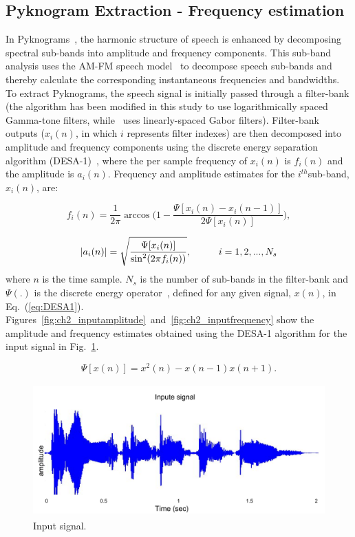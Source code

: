 {\subsection{Pyknogram Extraction - Frequency estimation}
\label{ssec:pykno_estimate}
In Pyknograms~\cite{potamianos_maragos_jasa96}, the harmonic structure of speech is enhanced by decomposing spectral sub-bands into amplitude and frequency components. 
This sub-band analysis uses the AM-FM speech model~\cite{maragos_kaiser_quatieri} to decompose speech sub-bands and thereby calculate the corresponding instantaneous frequencies and bandwidths. 
To extract Pyknograms, the speech signal is initially passed through a filter-bank (the algorithm has been modified in this study to use logarithmically spaced Gamma-tone filters, while~\cite{potamianos_maragos_jasa96} uses linearly-spaced Gabor filters). 
Filter-bank outputs ($x_i(n)$, in which $i$ represents filter indexes) are then decomposed into amplitude and frequency components using the discrete energy separation algorithm (DESA-1)~\cite{maragos_kaiser_quatieri}, where the per sample frequency of $x_i(n)$ is $f_i(n)$ and the amplitude is $a_i(n)$. Frequency and amplitude estimates for the $i^{th} $sub-band, $x_i(n)$, are:

\begin{equation}
	\label{eq:instfreq}
	f_i(n) = \frac{1}{2\pi}\arccos \Big (1-\frac{\Psi[x_i(n)-x_i(n-1)]}{2\Psi[x_i(n)]}\Big),
\end{equation}
	
	
\begin{equation}
	\label{eq:instamp}
	|a_i(n)| = \sqrt{\frac{\Psi[x_i(n)]}{\sin^2(2\pi f_i(n))}} , \hspace{10mm}i=1,2,...,N_s
\end{equation}
where $n$ is the time sample. $N_s$ is the number of sub-bands in the filter-bank and $\Psi(.)$ is the discrete energy operator~\cite{kaiser_teopaper,kaiser93}, defined for any given signal, $x(n)$, in Eq.~(\ref{eq:DESA1}). Figures~\ref{fig:ch2_inputamplitude}~and~\ref{fig:ch2_inputfrequency} show the amplitude and frequency estimates obtained using the DESA-1 algorithm for the input signal in Fig.~\ref{fig:ch2_inputsignal}. 

\begin{equation}
	\label{eq:DESA1}
	\Psi [x(n)] = x^2(n)-x(n-1)x(n+1).
\end{equation}


\begin{figure}[h!]
	\centering
	\includegraphics[height=2in, width=1\textwidth]{figures/teo_signal}
	\caption{ Input signal.}
	\label{fig:ch2_inputsignal}
\end{figure}
	
}
